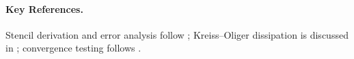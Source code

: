 








\paragraph{Key References.}
Stencil derivation and error analysis follow \cite{LeVeque2007};
Kreiss--Oliger dissipation is discussed in \cite{Gustafsson1995};
convergence testing follows \cite{Roache1998}.
